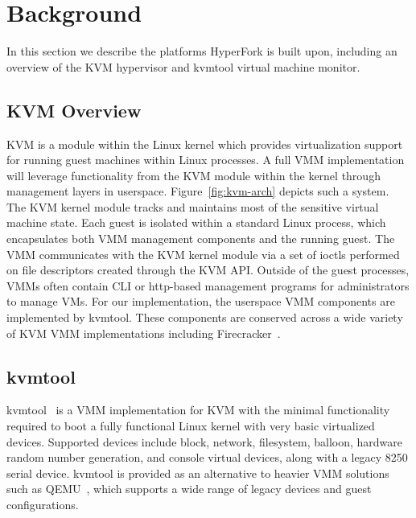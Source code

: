 \section{Background} \label{sec:background}

In this section we describe the platforms HyperFork is built upon, including an
overview of the KVM hypervisor and kvmtool virtual machine monitor.

\subsection{KVM Overview}

KVM is a module within the Linux kernel which provides virtualization support
for running guest machines within Linux processes. A full VMM implementation
will leverage functionality from the KVM module within the kernel through
management layers in userspace. Figure~\ref{fig:kvm-arch} depicts such a
system. The KVM kernel module tracks and maintains most of the sensitive
virtual machine state. Each guest is isolated within a standard Linux process,
which encapsulates both VMM management components and the running guest. The
VMM communicates with the KVM kernel module via a set of ioctls performed on
file descriptors created through the KVM API. Outside of the guest processes,
VMMs often contain CLI or http-based management programs for administrators to
manage VMs. For our implementation, the userspace VMM components are
implemented by kvmtool. These components are conserved across a wide variety of
KVM VMM implementations including Firecracker~\cite{firecracker}.

\begin{figure*}[t]
  \texttt{[image: \{figures/kvm-arch]}}
  \caption{KVM Software Architecture}
  \label{fig:kvm-arch}
\end{figure*}

\subsection{kvmtool}

kvmtool~\cite{kvmtool} is a VMM implementation for KVM with the minimal
functionality required to boot a fully functional Linux kernel with very basic
virtualized devices. Supported devices include block, network, filesystem,
balloon, hardware random number generation, and console virtual devices, along
with a legacy 8250 serial device. kvmtool is provided as an alternative to
heavier VMM solutions such as QEMU~\cite{qemu}, which supports a wide range of
legacy devices and guest configurations.

